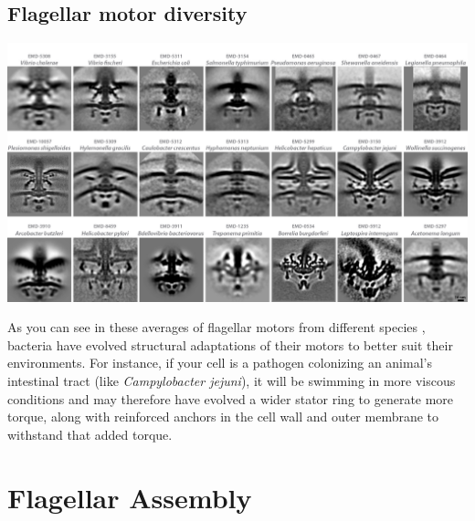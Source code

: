 \documentclass[]{tufte-book}
\begin{document}
\subsection{Flagellar motor diversity}\label{Flagellar_motor_diversity}

\includegraphics{img/schematics/6_2_1}

As you can see in these averages of flagellar motors from different
species \citep{murphy2006} \citep{chen2011} \citep{zhao2014}
\citep{beeby2016} \citep{qin2017} \citep{chaban2018} \citep{kaplan2019}
\citep{ferreira2019} \citep{chang2019}, bacteria have evolved structural
adaptations of their motors to better suit their environments. For
instance, if your cell is a pathogen colonizing an animal's intestinal
tract (like \emph{Campylobacter jejuni}), it will be swimming in more
viscous conditions and may therefore have evolved a wider stator ring to
generate more torque, along with reinforced anchors in the cell wall and
outer membrane to withstand that added torque.

\section{Flagellar Assembly}\label{flagellar-assembly}
\end{document}
